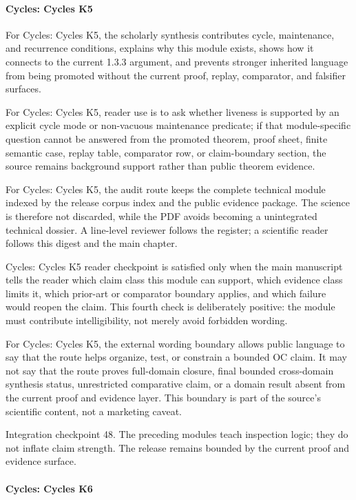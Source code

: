 \paragraph{Cycles: Cycles K5}

For Cycles: Cycles K5, the scholarly synthesis contributes cycle, maintenance, and recurrence conditions, explains why this module exists, shows how it connects to the current 1.3.3 argument, and prevents stronger inherited language from being promoted without the current proof, replay, comparator, and falsifier surfaces.


For Cycles: Cycles K5, reader use is to ask whether liveness is supported by an explicit cycle mode or non-vacuous maintenance predicate; if that module-specific question cannot be answered from the promoted theorem, proof sheet, finite semantic case, replay table, comparator row, or claim-boundary section, the source remains background support rather than public theorem evidence.


For Cycles: Cycles K5, the audit route keeps the complete technical module indexed by the release corpus index and the public evidence package. The science is therefore not discarded, while the PDF avoids becoming a unintegrated technical dossier. A line-level reviewer follows the register; a scientific reader follows this digest and the main chapter.


Cycles: Cycles K5 reader checkpoint is satisfied only when the main manuscript tells the reader which claim class this module can support, which evidence class limits it, which prior-art or comparator boundary applies, and which failure would reopen the claim. This fourth check is deliberately positive: the module must contribute intelligibility, not merely avoid forbidden wording.


For Cycles: Cycles K5, the external wording boundary allows public language to say that the route helps organize, test, or constrain a bounded OC claim. It may not say that the route proves full-domain closure, final bounded cross-domain synthesis status, unrestricted comparative claim, or a domain result absent from the current proof and evidence layer. This boundary is part of the source's scientific content, not a marketing caveat.


Integration checkpoint 48. The preceding modules teach inspection logic; they do not inflate claim strength. The release remains bounded by the current proof and evidence surface.


\paragraph{Cycles: Cycles K6}

